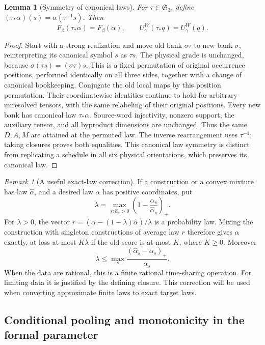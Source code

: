 \documentclass[11pt]{article}
\numberwithin{equation}{section}
\newtheorem{lemma}[theorem]{Lemma}
\theoremstyle{definition}
\theoremstyle{remark}
\newtheorem{remark}[theorem]{Remark}
\begin{document}
\begin{lemma}[Symmetry of canonical laws]
\label{val:canonical-symmetry}
For $\tau\in\mathfrak S_3$, define
$(\tau_*\alpha)(s)=\alpha(\tau^{-1}s)$.  Then
\[
 F_\beta(\tau_*\alpha)=F_\beta(\alpha),\qquad
 U^W_\gamma(\tau_*q)=U^W_\gamma(q).
\]
\end{lemma}

\begin{proof}
Start with a strong realization and move old bank $\sigma\tau$ to new bank
$\sigma$, reinterpreting its canonical symbol $s$ as $\tau s$.  The physical
grade is unchanged, because $\sigma(\tau s)=(\sigma\tau)s$.  This is a
fixed permutation of original occurrence positions, performed identically
on all three sides, together with a change of canonical bookkeeping.
Conjugate the old local maps by this position permutation.  Their
coordinatewise identities continue to hold for arbitrary unresolved tensors,
with the same relabeling of their original positions.  Every new bank has
canonical law $\tau_*\alpha$.  Source-word injectivity, nonzero support,
the auxiliary tensor, and all byproduct dimensions are unchanged.  Thus the
same $D,A,M$ are attained at the permuted law.  The inverse rearrangement
uses $\tau^{-1}$; taking closures proves both equalities.  This canonical
law symmetry is distinct from replicating a schedule in all six physical
orientations, which preserves its canonical law.
\end{proof}

\begin{remark}[A useful exact-law correction]
\label{val:dilution}
If a construction or a convex mixture has law $\widehat\alpha$, and a desired
law $\alpha$ has positive coordinates, put
\[
 \lambda=\max_{s:\widehat\alpha_s>0}
 \left(1-\frac{\alpha_s}{\widehat\alpha_s}\right)_+.
\]
For $\lambda>0$, the vector
$r=(\alpha-(1-\lambda)\widehat\alpha)/\lambda$ is a probability law.
Mixing the construction with singleton constructions of average law $r$
therefore gives $\alpha$ exactly, at loss at most $K\lambda$ if the old score
is at most $K$, where $K\ge0$.  Moreover
\[
 \lambda\le
 \max_s\frac{(\widehat\alpha_s-\alpha_s)_+}{\alpha_s}.
\]
When the data are rational, this is a finite rational time-sharing operation.
For limiting data it is justified by the defining closure.  This correction
will be used when converting approximate finite laws to exact target laws.
\end{remark}

\subsection{Conditional pooling and monotonicity in the formal parameter}
\label{val:pooling}
\end{document}
